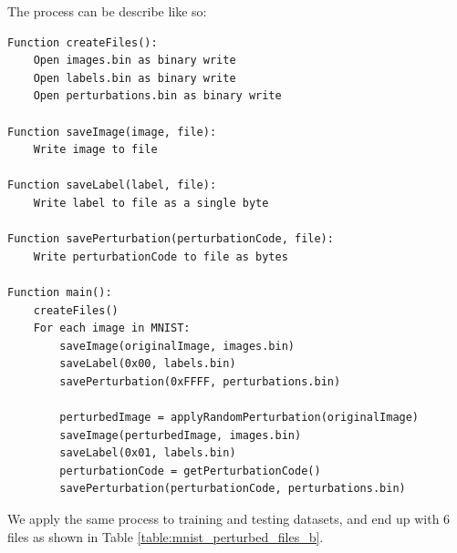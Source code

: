 The process can be describe like so:

\begin{lstlisting}[caption={MNIST Perturbation Algorithm}, label={lst:mnist_perturbation_algorithm}]
Function createFiles():
    Open images.bin as binary write
    Open labels.bin as binary write
    Open perturbations.bin as binary write

Function saveImage(image, file):
    Write image to file

Function saveLabel(label, file):
    Write label to file as a single byte

Function savePerturbation(perturbationCode, file):
    Write perturbationCode to file as bytes

Function main():
    createFiles()
    For each image in MNIST:
        saveImage(originalImage, images.bin)
        saveLabel(0x00, labels.bin)
        savePerturbation(0xFFFF, perturbations.bin)
        
        perturbedImage = applyRandomPerturbation(originalImage)
        saveImage(perturbedImage, images.bin)
        saveLabel(0x01, labels.bin)
        perturbationCode = getPerturbationCode()
        savePerturbation(perturbationCode, perturbations.bin)

\end{lstlisting}

We apply the same process to training and testing datasets, and end up with 6 files as shown in Table \ref{table:mnist_perturbed_files_b}.


